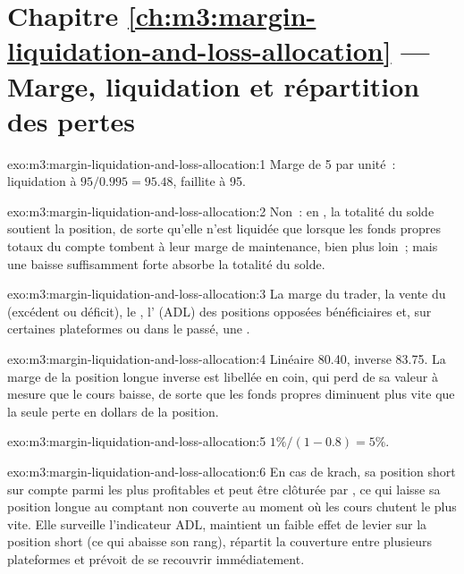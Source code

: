\section*{Chapitre \ref{ch:m3:margin-liquidation-and-loss-allocation} --- Marge, liquidation et répartition des pertes}

\begin{solution}{exo:m3:margin-liquidation-and-loss-allocation:1}
Marge de 5 par unité~: liquidation à $95/0.995 = 95.48$, faillite à 95.
\end{solution}

\begin{solution}{exo:m3:margin-liquidation-and-loss-allocation:2}
Non~: en , la totalité du solde soutient la position, de sorte qu'elle n'est liquidée que lorsque les fonds propres totaux du compte
tombent à leur marge de maintenance, bien plus loin~; mais une baisse suffisamment forte absorbe la totalité du solde.
\end{solution}

\begin{solution}{exo:m3:margin-liquidation-and-loss-allocation:3}
La marge du trader, la vente du  (excédent ou déficit), le , l' (ADL) des
positions opposées bénéficiaires et, sur certaines plateformes ou dans le passé, une .
\end{solution}

\begin{solution}{exo:m3:margin-liquidation-and-loss-allocation:4}
Linéaire 80.40, inverse 83.75. La marge de la position longue inverse est libellée en coin, qui perd de sa valeur à mesure que le cours baisse, de sorte que les fonds propres
diminuent plus vite que la seule perte en dollars de la position.
\end{solution}

\begin{solution}{exo:m3:margin-liquidation-and-loss-allocation:5}
$1\%/(1 - 0.8) = 5\%$.
\end{solution}

\begin{solution}{exo:m3:margin-liquidation-and-loss-allocation:6}
En cas de krach, sa position short sur  compte parmi les plus profitables et peut être clôturée par , ce qui laisse
sa position longue au comptant non couverte au moment où les cours chutent le plus vite. Elle surveille l'indicateur ADL, maintient un faible effet de levier sur la position short
(ce qui abaisse son rang), répartit la couverture entre plusieurs plateformes et prévoit de se recouvrir immédiatement.
\end{solution}

